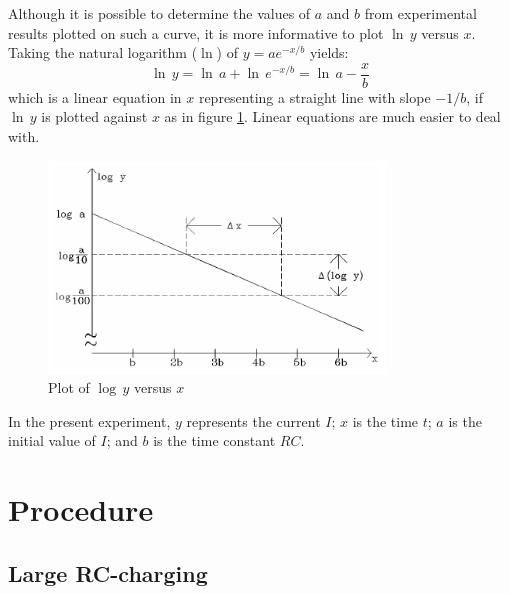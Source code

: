 Although it is possible to determine the values of $a$ and $b$ from experimental results plotted on such a curve, it is more informative to plot $\ln\,y$ versus $x$. Taking the natural logarithm ($\ln$) of $y=ae^{-x/b}$ yields:
\begin{equation}
    \ln\,y = \ln\,a + \ln\,e^{-x/b} = \ln\,a - \frac{x}{b}
    \label{eqn:logslope}
\end{equation}
which is a linear equation in $x$ representing a straight line with slope $-1/b$, if $\ln\,y$ is plotted against $x$ as in figure \ref{fig:logplot}. Linear equations are much easier to deal with. \myskip

\begin{figure}[h]
   \begin{center}
       \includegraphics[width=0.8\textwidth]{./Exp3/pic/image5.png}
   \end{center}
   \caption{Plot of $\log\,y$ versus $x$}
   \label{fig:logplot}
\end{figure}

In the present experiment, $y$ represents the current $I$; $x$ is the time $t$; $a$ is the initial value of $I$; and $b$ is the time constant $RC$. \myskip

\section{Procedure}

\subsection{Large RC-charging}

